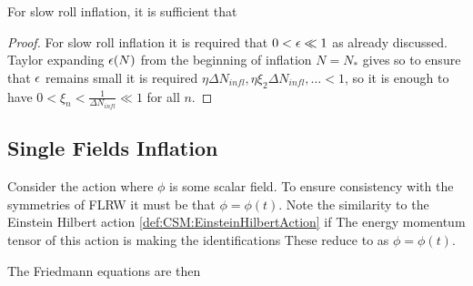 \documentclass{article}
\begin{document}
\begin{prop}
For slow roll inflation, it is sufficient that 
\end{prop}
\begin{proof}
For slow roll inflation it is required that $0 < \epsilon \ll 1$ as already discussed. Taylor expanding $\epsilon(N)$ from the beginning of inflation $N=N_\ast$ gives 
so to ensure that $\epsilon$ remains small it is required $\eta \Delta N_{infl}, \eta \xi_2 \Delta N_{infl}, \dots < 1$, so it is enough to have $0<\xi_n < \frac{1}{\Delta N_{infl}} \ll 1$ for all $n$. 
\end{proof}

\subsection{Single Fields Inflation}

Consider the action
where $\phi$ is some scalar field. To ensure consistency with the symmetries of FLRW it must be that $\phi = \phi(t)$.  Note the similarity to the Einstein Hilbert action \ref{def:CSM:EinsteinHilbertAction} if 
The energy momentum tensor of this action is 
making the identifications 
These reduce to 
as $\phi=\phi(t)$. 

The Friedmann equations are then 
\end{document}

